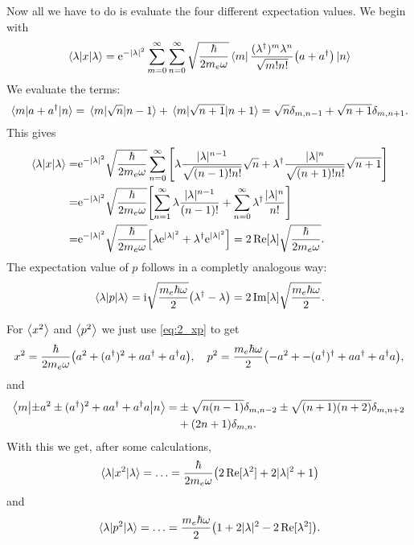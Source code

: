 \documentclass[11pt,letter, swedish, english
]{article}
\begin{document}
Now all we have to do is evaluate the four different expectation
values. We begin with
\begin{equation}
\ev{x}{\lambda}=\ee^{-|\lambda|^2}
\sum_{m=0}^\infty\sum_{n=0}^\infty\sqrt{\frac{\hbar}{2m_e\omega}}
\bra{m}\frac{(\lambda^\dagger)^m\lambda^{n}}{\sqrt{m!n!}}\qty(a+a^\dagger)
\ket{n}
\end{equation}
We evaluate the terms:
\begin{equation}
\mel{m}{a+a^\dagger}{n}=\mel{m}{\sqrt{n}}{n-1}+\mel{m}{\sqrt{n+1}}{n+1}
=\sqrt{n}\delta_{m, n-1}+\sqrt{n+1}\delta_{m, n+1}.
\end{equation}
This gives
\begin{equation}
\begin{aligned}
\ev{x}{\lambda}=&\ee^{-|\lambda|^2}
\sqrt{\frac{\hbar}{2m_e\omega}}\sum_{n=0}^\infty
\qty[
\lambda\frac{|\lambda|^{n-1}}{\sqrt{(n-1)!n!}}\sqrt{n} 
+\lambda^\dagger\frac{|\lambda|^{n}}{\sqrt{(n+1)!n!}}\sqrt{n+1} 
]\\
=&\ee^{-|\lambda|^2}\sqrt{\frac{\hbar}{2m_e\omega}}
\qty[
\sum_{n=1}^\infty\lambda\frac{|\lambda|^{n-1}}{(n-1)!}
+\sum_{n=0}^\infty\lambda^\dagger\frac{|\lambda|^{n}}{n!}
]\\
=&\ee^{-|\lambda|^2}\sqrt{\frac{\hbar}{2m_e\omega}}
\qty[\lambda\ee^{|\lambda|^2}
+\lambda^\dagger\ee^{|\lambda|^2}]
=2\Re[\lambda]\sqrt{\frac{\hbar}{2m_e\omega}}.
\end{aligned}
\end{equation}
The expectation value of $p$ follows in a completly analogous way: 
\begin{equation}
\ev{p}{\lambda}=\ii\sqrt{\frac{m_e\hbar\omega}{2}}\qty(\lambda^\dagger-\lambda)
=2\Im[\lambda]\sqrt{\frac{m_e\hbar\omega}{2}}.
\end{equation}

For $\ev{x^2}$ and $\ev{p^2}$ we just use \eqref{eq:2_xp} to get
\begin{equation}
x^2=\frac{\hbar}{2m_e\omega}
\qty(a^2+(a^\dagger)^2+aa^\dagger+a^{\dagger}a)\qcomma
p^2=\frac{m_e\hbar\omega}{2}
\qty(-a^2+-(a^\dagger)^\dagger + aa^\dagger + a^{\dagger}a),
\end{equation}
and
\begin{equation}
\begin{aligned}
\mel**{m}{\pm{}a^2\pm(a^\dagger)^2+aa^\dagger+a^{\dagger}a}{n}=&
\pm\sqrt{n(n-1)}\delta_{m, n-2} \pm\sqrt{(n+1)(n+2)}\delta_{m, n+2}\\
&+(2n+1)\delta_{m, n}. 
\end{aligned}
\end{equation}
With this we get, after some calculations,
\begin{equation}
\ev{x^2}{\lambda}=\ldots=
\frac{\hbar}{2m_e\omega}\qty(2\Re[\lambda^2] + 2|\lambda|^2 + 1)
\end{equation}
and
\begin{equation}
\ev{p^2}{\lambda}=\ldots=
\frac{m_e\hbar\omega}{2}\qty(1+2|\lambda|^2 - 2\Re[\lambda^2]).
\end{equation}
\end{document}
